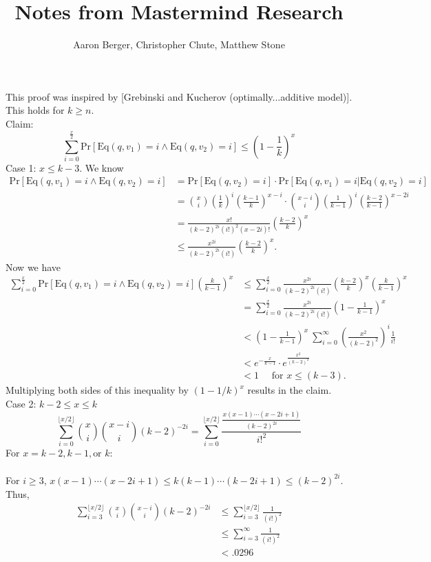 \documentclass[12pt, a4paper]{article}
\author{Aaron Berger, Christopher Chute, Matthew Stone}
\title{Notes from Mastermind Research}
\begin{document}
This proof was inspired by [Grebinski and Kucherov (optimally...additive model)]. This holds for $k\geq n$. \\
Claim:
\begin{equation*}
	\sum_{i=0}^{\frac{x}{2}}\text{Pr}[\text{Eq}(q,v_1) = i \wedge \text{Eq}(q,v_2) = i] \leq \left(1-\frac{1}{k}\right)^x
\end{equation*}
Case 1: $x \leq k-3$. We know 
\begin{align*}
\text{Pr}[\text{Eq}(q,v_1) = i \wedge \text{Eq}(q,v_2) = i] &= 
\text{Pr}[\text{Eq}(q,v_2) = i] \cdot
\text{Pr}[\text{Eq}(q,v_1) = i | \text{Eq}(q,v_2) = i]   \\
& = \binom{x}{i}\left(\frac{1}{k}\right)^i \left(\frac{k-1}{k}\right)^{x-i} \cdot \binom{x-i}{i}\left(\frac{1}{k-1}\right)^{i}\left(\frac{k-2}{k-1}\right)^{x-2i} \\
&=\frac{x!}{(k-2)^{2i}(i!)^2(x-2i)!}\left(\frac{k-2}{k}\right)^x \\
&\leq \frac{x^{2i}}{(k-2)^{2i}(i!)}\left(\frac{k-2}{k}\right)^x.
\end{align*}
Now we have 
\begin{align*}
\sum_{i=0}^{\frac{x}{2}}\text{Pr}[\text{Eq}(q,v_1) = i \wedge \text{Eq}(q,v_2) = i] \left(\frac{k}{k-1}\right)^x 
&\leq \sum_{i=0}^{\frac{x}{2}} \frac{x^{2i}}{(k-2)^{2i}(i!)}\left(\frac{k-2}{k}\right)^x \left(\frac{k}{k-1}\right)^x \\
&=\sum_{i=0}^{\frac{x}{2}} \frac{x^{2i}}{(k-2)^{2i}(i!)}\left(1-\frac{1}{k-1}\right)^x \\
&<\left(1-\frac{1}{k-1}\right)^x ~ \sum_{i=0}^{\infty} \left(\frac{x^2}{(k-2)^2}\right)^i\frac{1}{i!} \\
&<e^{-\frac{x}{k-1}}\cdot e^\frac{x^2}{(k-2)^2} \\
&<1\quad \text{ for } x \leq (k-3).
\end{align*}
Multiplying both sides of this inequality by $(1-1/k)^x$ results in the claim. 
\clearpage
Case 2: $k-2 \leq x \leq k$
\begin{equation*}
\sum_{i=0}^{\lfloor x/2 \rfloor} \binom{x}{i}\binom{x-i}{i}(k-2)^{-2i}=\sum_{i=0}^{\lfloor x/2 \rfloor} \frac{\frac{x(x-1)\cdots(x-2i+1)}{(k-2)^{2i}}}{i!^2}
\end{equation*}
For $x=k-2, k-1, \text{or } k$:\\
\\
For $i\ge3$, $x(x-1)\cdots(x-2i+1)\le k(k-1)\cdots(k-2i+1)\le(k-2)^{2i}$. Thus, 
\begin{align*}
\sum_{i=3}^{\lfloor x/2 \rfloor} \binom{x}{i}\binom{x-i}{i}(k-2)^{-2i} & \le \sum_{i=3}^{\lfloor x/2 \rfloor} \frac{1}{(i!)^2} \\
& \le \sum_{i=3}^\infty \frac{1}{(i!)^2} \\
& < .0296\\
\end{align*}
\end{document}
